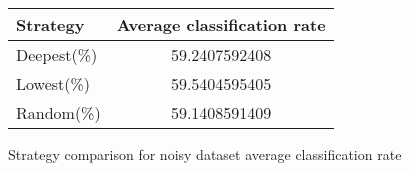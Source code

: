 \begin{figure}[h]
 \begin{center}
  \caption{Strategy comparison for noisy dataset average classification rate}
   \begin{tabular}{ | l || c | }
    \hline
	 Strategy & Average classification rate \\ \hline \hline
        Deepest(\%) & 59.2407592408 \\ \hline
        Lowest(\%) & 59.5404595405 \\ \hline
        Random(\%) & 59.1408591409 \\ \hline
    \end{tabular}
    \label{fig:averageClassificationRate}
\end{center}
\end{figure}



